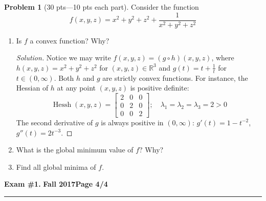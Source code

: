 \documentclass[12pt]{article}
\theoremstyle{definition}
\newtheorem{problem}{Problem}
\def\field#1{\mathbb{#1}}
\def\Hess#1{\mathop{\mathrm{Hess}{#1}}}
\begin{document}
\bigskip
\begin{problem}[30 pts---10 pts each part]
Consider the function
\begin{equation*}
f(x,y,z) = x^2+y^2+z^2 + \frac{1}{x^2+y^2+z^2}
\end{equation*}
\begin{enumerate}
  \item Is $f$ a convex function?  Why?
  \begin{proof}[Solution]
  Notice we may write $f(x,y,z) = (g\circ h) (x,y,z)$, where $h(x,y,z) = x^2+y^2+z^2$ for $(x,y,z) \in \field{R}^3$ and $g(t) = t+\tfrac{1}{t}$ for $t \in (0,\infty)$.  Both $h$ and $g$ are strictly convex functions. For instance, the Hessian of $h$ at any point $(x,y,z)$ is positive definite:
  \begin{equation*}
  \Hess{h}(x,y,z) = \begin{bmatrix} 2 & 0 & 0 \\ 0 & 2 & 0 \\ 0 & 0 & 2 \end{bmatrix}; \quad \lambda_1 = \lambda_2 = \lambda_3 = 2 >0
  \end{equation*}
  The second derivative of $g$ is always positive in $(0,\infty)$: $g'(t) = 1- t^{-2}$, $g''(t) = 2t^{-3}$.  
  \end{proof}
  \item What is the global minimum value of $f$?  Why?
  \vspace{1cm}
  \item Find all global minima of $f$.
\end{enumerate}
\end{problem}
\newpage

\hfill{\large\bf Exam \#1.}\hfill{\large\bf
  Fall 2017}\hfill{\large\bf Page 4/4}\hrule
\end{document}
